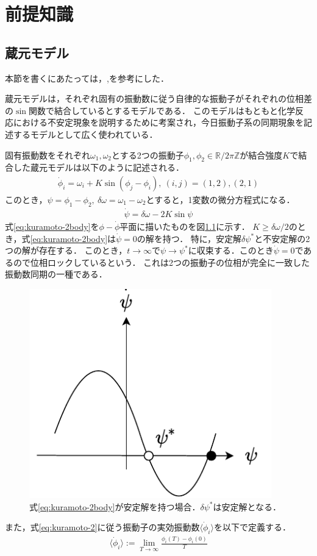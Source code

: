 \documentclass[../main]{subfiles}
\begin{document}
\chapter{前提知識}
\label{chap:prev}
\section{蔵元モデル}
本節を書くにあたっては，\cite{RODRIGUES20161},\cite{biorhythm}を参考にした．

蔵元モデルは，それぞれ固有の振動数に従う自律的な振動子がそれぞれの位相差の$\sin$関数で結合しているとするモデルである．
このモデルはもともと化学反応における不安定現象を説明するために考案され\cite{kuramoto1975}，今日振動子系の同期現象を記述するモデルとして広く使われている．

固有振動数をそれぞれ$\omega_1,\omega_2$とする2つの振動子$\phi_1,\phi_2\in\mathbb{R}/2\pi\mathbb{Z}$が結合強度$K$で結合した蔵元モデルは以下のように記述される．
\begin{align}
    \label{eq:kuramoto-2}
    \dot{\phi}_i=\omega_i+K\sin(\phi_j-\phi_i),\ (i,j)=(1,2),(2,1)
\end{align}
このとき，$\psi=\phi_1-\phi_2,\ \delta\omega=\omega_1-\omega_2$とすると，1変数の微分方程式になる．
\begin{align}
    \label{eq:kuramoto-2body}
    \dot{\psi}=\delta\omega-2K\sin\psi  
\end{align}
式\eqref{eq:kuramoto-2body}を$\phi-\dot{\phi}$平面に描いたものを図\ref{fig:kuramoto-2}に示す．
$K\geq\delta\omega/2$のとき，式\eqref{eq:kuramoto-2body}は$\dot{\psi}=0$の解を持つ．
特に，安定解$\delta\psi^\ast$と不安定解の2つの解が存在する．
このとき，$t\to\infty$で$\psi\to\psi^\ast$に収束する．このとき$\dot{\psi}=0$であるので位相ロックしているという．
これは2つの振動子の位相が完全に一致した振動数同期の一種である．\\
\begin{figure}[t]
\centering
\includegraphics[width=105mm]{images/kuramoto-2.pdf}
\centering
\caption{式\eqref{eq:kuramoto-2body}が安定解を持つ場合．$\delta\psi^\ast$は安定解となる．}
\label{fig:kuramoto-2}
\end{figure}
また，式\eqref{eq:kuramoto-2}に従う振動子の実効振動数$\langle\dot{\phi}_i\rangle$を以下で定義する．
\begin{align*}
    \langle\dot{\phi}_i\rangle:=\lim_{T\to\infty}\frac{\phi_i(T)-\phi_i(0)}{T}
\end{align*}
\end{document}
